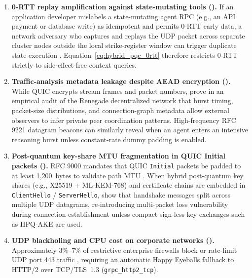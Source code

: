\documentclass[11pt]{article}
\begin{document}
\begin{enumerate}
  \item \textbf{0-RTT replay amplification against state-mutating tools (\citet{fischlin2024quic, rescorla2018rfc8446}).} If an application developer mislabels a state-mutating agent RPC (e.g., an API payment or database write) as idempotent and permits 0-RTT early data, a network adversary who captures and replays the UDP packet across separate cluster nodes outside the local strike-register window can trigger duplicate state execution \citep{fischlin2024quic}. Equation~\eqref{eq:hybrid_pqc_0rtt} therefore restricts 0-RTT strictly to side-effect-free context queries.
  \item \textbf{Traffic-analysis metadata leakage despite AEAD encryption (\citet{arote2026renegade}).} While QUIC encrypts stream frames and packet numbers, \citet{arote2026renegade} prove in an empirical audit of the Renegade decentralized network that burst timing, packet-size distributions, and connection-graph metadata allow external observers to infer private peer coordination patterns. High-frequency RFC 9221 datagram beacons can similarly reveal when an agent enters an intensive reasoning burst unless constant-rate dummy padding is enabled.
  \item \textbf{Post-quantum key-share MTU fragmentation in QUIC Initial packets (\citet{commey2026matter, phamtuan2026hpqake}).} RFC 9000 mandates that QUIC \texttt{Initial} packets be padded to at least 1{,}200~bytes to validate path MTU \citep{iyengar2021rfc9000}. When hybrid post-quantum key shares (e.g., X25519 + ML-KEM-768) and certificate chains are embedded in \texttt{ClientHello} / \texttt{ServerHello}, \citet{commey2026matter} show that handshake messages split across multiple UDP datagrams, re-introducing multi-packet loss vulnerability during connection establishment unless compact sign-less key exchanges such as HPQ-AKE \citep{phamtuan2026hpqake} are used.
  \item \textbf{UDP blackholing and CPU cost on corporate networks (\citet{kuehlewind2022rfc9308, langley2017quic}).} Approximately $3\%$--$7\%$ of restrictive enterprise firewalls block or rate-limit UDP port 443 traffic \citep{langley2017quic, kuehlewind2022rfc9308}, requiring an automatic Happy Eyeballs fallback to HTTP/2 over TCP/TLS~1.3 (\texttt{grpc\_\linebreak[0]http2\_\linebreak[0]tcp}).
\end{enumerate}
\end{document}
